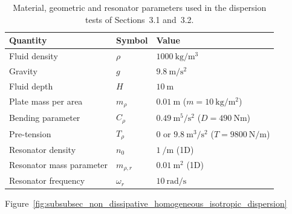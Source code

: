 \begin{table}[h!]
    \centering
    \caption{Material, geometric and resonator parameters used in the dispersion tests of Sections~3.1 and~3.2.}
    \label{tab:dispersion_test_parameters}
    \footnotesize
    \begin{tabular}{lll}
        \hline
        Quantity & Symbol & Value \\
        \hline
        Fluid density & $\rho$ & $1000\ \si{\kilogram\per\meter\cubed}$ \\
        Gravity & $g$ & $9.8\ \si{\meter\per\second\squared}$ \\
        Fluid depth & $H$ & $10\ \si{\meter}$ \\
        Plate mass per area & $m_\rho$ & $0.01\ \si{\meter}$ ($m=10\ \si{\kilogram\per\meter\squared}$) \\
        Bending parameter & $C_\rho$ & $0.49\ \si{\meter\tothe{5}\per\second\squared}$ ($D=490\ \si{\newton\meter}$) \\
        Pre-tension & $T_\rho$ & $0$ or $9.8\ \si{\meter\cubed\per\second\squared}$ ($T=9800\ \si{\newton\per\meter}$) \\
        Resonator density & $n_0$ & $1\ \si{\per\meter}$ (1D) \\
        Resonator mass parameter & $m_{\rho,r}$ & $0.01\ \si{\meter\squared}$ (1D) \\
        Resonator frequency & $\omega_r$ & $10\ \si{\radian\per\second}$ \\
        \hline
    \end{tabular}
\end{table}
%
%
Figure~\ref{fig:subsubsec_non_dissipative_homogeneous_isotropic_dispersion}
